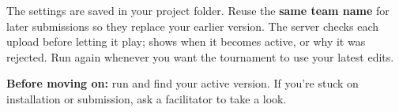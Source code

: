 \documentclass[11pt]{article}
\begin{document}
The settings are saved in your project folder. Reuse the \textbf{same team name} for later submissions so they replace your earlier version. The server checks each upload before letting it play;  shows when it becomes active, or why it was rejected. Run  again whenever you want the tournament to use your latest edits.


\begin{checkpoint}
\textbf{Before moving on:} run  and find your active version. If you're stuck on installation or submission, ask a facilitator to take a look.
\end{checkpoint}
\clearpage

\clearpage

\clearpage

\end{document}
